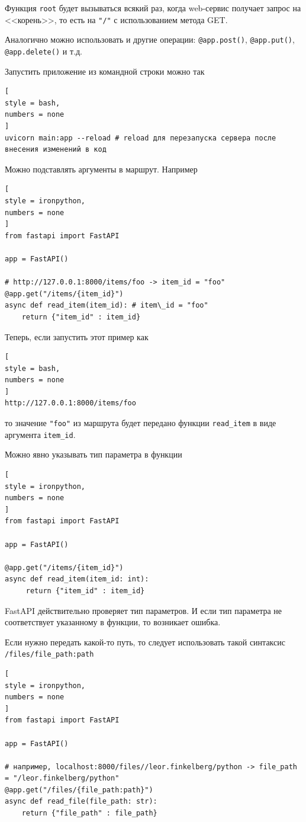 \documentclass[%
	11pt,
	a4paper,
	utf8,
		]{article}
\begin{document}
Функция \texttt{root} будет вызываться всякий раз, когда web-сервис получает запрос на <<корень>>, то есть на \verb|"/"| с использованием метода GET.

Аналогично можно использовать и другие операции: \verb|@app.post()|, \verb|@app.put()|, \verb|@app.delete()| и т.д.

Запустить приложение из командной строки можно так
\begin{lstlisting}[
style = bash,
numbers = none	
]
uvicorn main:app --reload # reload для перезапуска сервера после внесения изменений в код
\end{lstlisting}

Можно подставлять аргументы в маршрут. Например
\begin{lstlisting}[
style = ironpython,
numbers = none	
]
from fastapi import FastAPI

app = FastAPI()

# http://127.0.0.1:8000/items/foo -> item_id = "foo"
@app.get("/items/{item_id}")
async def read_item(item_id): # item\_id = "foo"
    return {"item_id" : item_id}
\end{lstlisting}

Теперь, если запустить этот пример как
\begin{lstlisting}[
style = bash,
numbers = none	
]
http://127.0.0.1:8000/items/foo
\end{lstlisting}
то значение \verb|"foo"| из маршрута будет передано функции \texttt{read\_item} в виде аргумента \texttt{item\_id}.

Можно явно указывать тип параметра в функции
\begin{lstlisting}[
style = ironpython,
numbers = none	
]
from fastapi import FastAPI

app = FastAPI()

@app.get("/items/{item_id}")
async def read_item(item_id: int):
     return {"item_id" : item_id}
\end{lstlisting}

FastAPI действительно проверяет тип параметров. И если тип параметра не соответствует указанному в функции, то возникает ошибка.

Если нужно передать какой-то путь, то следует использовать такой синтаксис \texttt{/files/{file\_path:path}}
\begin{lstlisting}[
style = ironpython,
numbers = none	
]
from fastapi import FastAPI

app = FastAPI()

# например, localhost:8000/files//leor.finkelberg/python -> file_path = "/leor.finkelberg/python"
@app.get("/files/{file_path:path}")
async def read_file(file_path: str):
    return {"file_path" : file_path}
\end{lstlisting}
\end{document}
